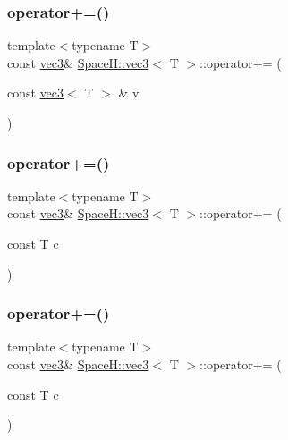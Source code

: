 \subsubsection{\texorpdfstring{operator+=()}{operator+=()}\hspace{0.1cm}{\footnotesize\ttfamily [4/7]}}
{\footnotesize\ttfamily template$<$typename T$>$ \\
const \mbox{\hyperlink{struct_space_h_1_1vec3}{vec3}}\& \mbox{\hyperlink{struct_space_h_1_1vec3}{Space\+H\+::vec3}}$<$ T $>$\+::operator+= (\begin{DoxyParamCaption}\item[{const \mbox{\hyperlink{struct_space_h_1_1vec3}{vec3}}$<$ T $>$ \&}]{v }\end{DoxyParamCaption})\hspace{0.3cm}{\ttfamily [inline]}}

\mbox{\label{struct_space_h_1_1vec3_a444d5277ca3ad78b88dbba50d45007f1}} 
\subsubsection{\texorpdfstring{operator+=()}{operator+=()}\hspace{0.1cm}{\footnotesize\ttfamily [5/7]}}
{\footnotesize\ttfamily template$<$typename T$>$ \\
const \mbox{\hyperlink{struct_space_h_1_1vec3}{vec3}}\& \mbox{\hyperlink{struct_space_h_1_1vec3}{Space\+H\+::vec3}}$<$ T $>$\+::operator+= (\begin{DoxyParamCaption}\item[{const T}]{c }\end{DoxyParamCaption})\hspace{0.3cm}{\ttfamily [inline]}}

\mbox{\label{struct_space_h_1_1vec3_a444d5277ca3ad78b88dbba50d45007f1}} 
\subsubsection{\texorpdfstring{operator+=()}{operator+=()}\hspace{0.1cm}{\footnotesize\ttfamily [6/7]}}
{\footnotesize\ttfamily template$<$typename T$>$ \\
const \mbox{\hyperlink{struct_space_h_1_1vec3}{vec3}}\& \mbox{\hyperlink{struct_space_h_1_1vec3}{Space\+H\+::vec3}}$<$ T $>$\+::operator+= (\begin{DoxyParamCaption}\item[{const T}]{c }\end{DoxyParamCaption})\hspace{0.3cm}{\ttfamily [inline]}}

